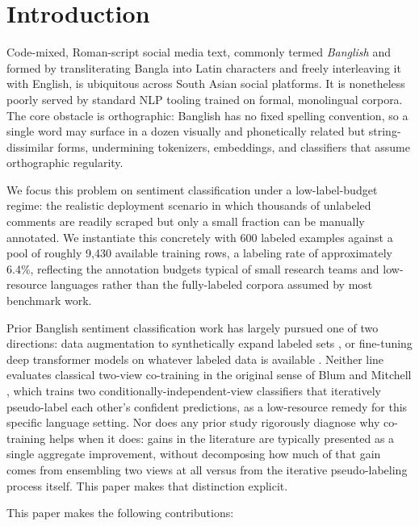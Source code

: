 \documentclass[conference]{IEEEtran}
\begin{document}
\section{Introduction}
\label{sec:intro}

Code-mixed, Roman-script social media text, commonly termed \emph{Banglish}
and formed by transliterating Bangla into Latin characters and freely
interleaving it with English, is ubiquitous across South Asian social
platforms. It is nonetheless poorly served by standard NLP tooling trained on
formal, monolingual corpora.
The core obstacle is orthographic: Banglish has no fixed spelling convention,
so a single word may surface in a dozen visually and phonetically related but
string-dissimilar forms, undermining tokenizers, embeddings, and classifiers
that assume orthographic regularity.

We focus this problem on sentiment classification under a low-label-budget
regime: the realistic deployment scenario in which thousands of unlabeled
comments are readily scraped but only a small fraction can be manually
annotated. We instantiate this concretely with 600 labeled examples against a
pool of roughly 9{,}430 available training rows, a labeling rate of
approximately 6.4\%, reflecting the annotation budgets typical of small
research teams and low-resource languages rather than the fully-labeled
corpora assumed by most benchmark work.

Prior Banglish sentiment classification work has largely pursued one of two
directions: data augmentation to synthetically expand labeled sets
\citep{tareq2023augmentation, sultana2024crosslingual}, or fine-tuning deep
transformer models on whatever labeled data is available
\citep{alam2025bnsentmix}. Neither line evaluates classical two-view
co-training in the original sense of Blum and Mitchell
\citep{blum1998combining}, which trains two conditionally-independent-view
classifiers that iteratively pseudo-label each other's confident predictions,
as a low-resource remedy for this specific language setting. Nor does any
prior study rigorously diagnose why co-training helps when it does: gains in
the literature are typically presented as a single aggregate improvement,
without decomposing how much of that gain comes from ensembling two views at
all versus from the iterative pseudo-labeling process itself. This paper
makes that distinction explicit.

This paper makes the following contributions:
\end{document}
